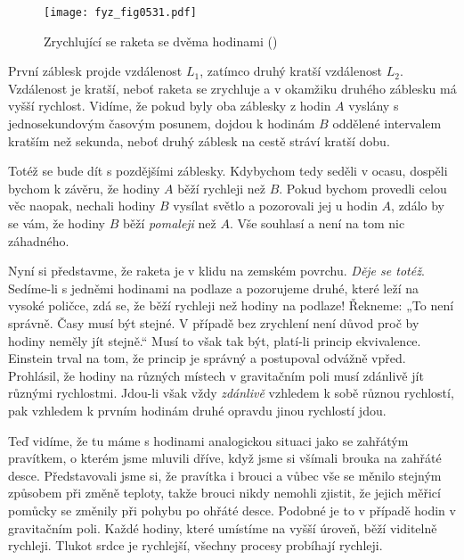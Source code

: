     \begin{figure}[ht!] %
      \centering
      \texttt{[image: fyz\_fig0531.pdf]}
      \caption{Zrychlující se raketa se dvěma hodinami (\cite[s.~786]{Feynman02})}
      \label{fyz:fig0531}
    \end{figure}
    
    První záblesk projde vzdálenost \(L_1\), zatímco druhý kratší vzdálenost \(L_2\). Vzdálenost je 
    kratší, neboť raketa se zrychluje a v okamžiku druhého záblesku má vyšší rychlost. Vidíme, že 
    pokud byly oba záblesky z hodin \(A\) vyslány s jednosekundovým časovým posunem, dojdou k 
    hodinám \(B\) oddělené intervalem kratším než sekunda, neboť druhý záblesk na cestě stráví 
    kratší dobu.
    
    Totéž se bude dít s pozdějšími záblesky. Kdybychom tedy seděli v ocasu, dospěli bychom k 
    závěru, že hodiny \(A\) běží rychleji než \(B\). Pokud bychom provedli celou věc naopak, 
    nechali hodiny \(B\) vysílat světlo a pozorovali jej u hodin \(A\), zdálo by se vám, že hodiny 
    \(B\) běží \emph{pomaleji} než \(A\). Vše souhlasí a není na tom nic záhadného.
    
    Nyní si představme, že raketa je v klidu na zemském povrchu. \emph{Děje se totéž}. Sedíme-li s 
    jedněmi hodinami na podlaze a pozorujeme druhé, které leží na vysoké poličce, zdá se, že běží 
    rychleji než hodiny na podlaze! Řekneme: „To není správně. Časy musí být stejné. V případě bez 
    zrychlení není důvod proč by hodiny neměly jít stejně.“ Musí to však tak být, platí-li princip 
    ekvivalence. Einstein trval na tom, že princip je správný a postupoval odvážně vpřed. 
    Prohlásil, že hodiny na různých místech v gravitačním poli musí zdánlivě jít různými 
    rychlostmi. Jdou-li však vždy \emph{zdánlivě} vzhledem k sobě různou rychlostí, pak vzhledem k 
    prvním hodinám druhé opravdu jinou rychlostí jdou.
    
    Teď vidíme, že tu máme s hodinami analogickou situaci jako se zahřátým pravítkem, o kterém jsme 
    mluvili dříve, když jsme si všímali brouka na zahřáté desce. Představovali jsme si, že pravítka 
    i brouci a vůbec vše se měnilo stejným způsobem při změně teploty, takže brouci nikdy nemohli 
    zjistit, že jejich měřicí pomůcky se změnily při pohybu po ohřáté desce. Podobné je to v 
    případě hodin v gravitačním poli. Každé hodiny, které umístíme na vyšší úroveň, běží viditelně 
    rychleji. Tlukot srdce je rychlejší, všechny procesy probíhají rychleji.


